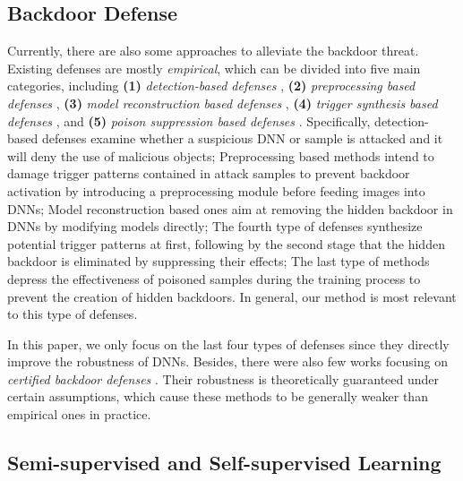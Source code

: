 \subsection{Backdoor Defense}
Currently, there are also some approaches to alleviate the backdoor threat. Existing defenses are mostly \emph{empirical}, which can be divided into five main categories, including \textbf{(1)} \emph{detection-based defenses} \citep{xu2021detecting,zeng2021rethinking,xiang2022post}, \textbf{(2)} \emph{preprocessing based defenses} \citep{doan2020februus,li2021backdoor2,zeng2021deepsweep}, \textbf{(3)} \emph{model reconstruction based defenses} \citep{zhao2020bridging,li2021neural,zeng2022adversarial}, \textbf{(4)} \emph{trigger synthesis based defenses} \citep{guo2020towards,dong2021black,shen2021backdoor}, and \textbf{(5)} \emph{poison suppression based defenses} \citep{du2019robust,borgnia2021strong}. Specifically, detection-based defenses examine whether a suspicious DNN or sample is attacked and it will deny the use of malicious objects; Preprocessing based methods intend to damage trigger patterns contained in attack samples to prevent backdoor activation by introducing a preprocessing module before feeding images into DNNs; Model reconstruction based ones aim at removing the hidden backdoor in DNNs by modifying models directly; The fourth type of defenses synthesize potential trigger patterns at first, following by the second stage that the hidden backdoor is eliminated by suppressing their effects; The last type of methods depress the effectiveness of poisoned samples during the training process to prevent the creation of hidden backdoors. In general, our method is most relevant to this type of defenses. %

In this paper, we only focus on the last four types of defenses since they directly improve the robustness of DNNs. Besides, there were also few works focusing on \emph{certified backdoor defenses} \citep{wang2020certifying,weber2020rab}.
Their robustness is theoretically guaranteed under certain assumptions, which cause these methods to be generally weaker than empirical ones in practice.

\subsection{Semi-supervised and Self-supervised Learning}


